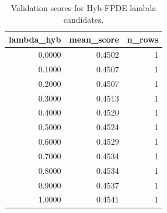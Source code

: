 \begin{table}[t]
\caption{Validation scores for Hyb-FPDE lambda candidates.}
\label{tab:lambda_distribution_computed}
\centering
\begin{tabular}{rrr}
\toprule
lambda\_hyb & mean\_score & n\_rows \\
\midrule
0.0000 & 0.4502 & 1 \\
0.1000 & 0.4507 & 1 \\
0.2000 & 0.4507 & 1 \\
0.3000 & 0.4513 & 1 \\
0.4000 & 0.4520 & 1 \\
0.5000 & 0.4524 & 1 \\
0.6000 & 0.4529 & 1 \\
0.7000 & 0.4534 & 1 \\
0.8000 & 0.4534 & 1 \\
0.9000 & 0.4537 & 1 \\
1.0000 & 0.4541 & 1 \\
\bottomrule
\end{tabular}

\end{table}
